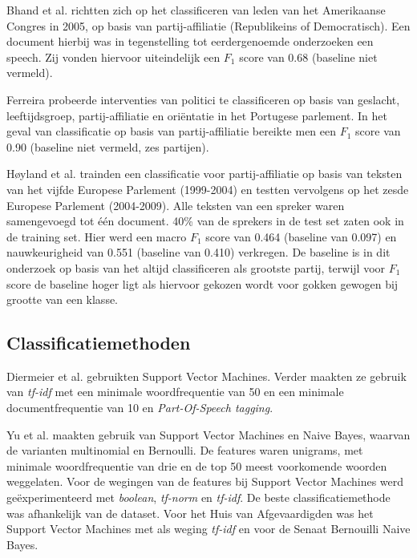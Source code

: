 Bhand et al. \cite{bhand} richtten zich op het classificeren van leden van het Amerikaanse Congres in 2005, op basis van partij-affiliatie (Republikeins of Democratisch). Een document hierbij was in tegenstelling tot eerdergenoemde onderzoeken een speech. Zij vonden hiervoor uiteindelijk een $F_1$ score van 0.68 (baseline niet vermeld).\par

Ferreira \cite{Ferreira2016UsingTT} probeerde interventies van politici te classificeren op basis van geslacht, leeftijdsgroep, partij-affiliatie en oriëntatie in het Portugese parlement. In het geval van classificatie op basis van partij-affiliatie bereikte men een $F_1$ score van 0.90 (baseline niet vermeld, zes partijen).\par

Høyland et al. \cite{W14-2516} trainden een classificatie voor partij-affiliatie op basis van teksten van het vijfde Europese Parlement (1999-2004) en testten vervolgens op het zesde Europese Parlement (2004-2009). Alle teksten van een spreker waren samengevoegd tot één document. 40\% van de sprekers in de test set zaten ook in de training set. Hier werd een macro $F_1$ score van 0.464 (baseline van 0.097) en nauwkeurigheid van 0.551 (baseline van 0.410) verkregen. De baseline is in dit onderzoek op basis van het altijd classificeren als grootste partij, terwijl voor $F_1$ score de baseline hoger ligt als hiervoor gekozen wordt voor gokken gewogen bij grootte van een klasse. \par

\subsection{Classificatiemethoden}
\label{sec:Deelvraag1}
Diermeier et al. \cite{diermeier_godbout_yu_kaufmann_2012} gebruikten Support Vector Machines. Verder maakten ze gebruik van \textit{tf-idf} met een minimale woordfrequentie van 50 en een minimale documentfrequentie van 10 en \textit{Part-Of-Speech tagging}.\par

Yu et al. \cite{doi:10.1080/19331680802149608} maakten gebruik van Support Vector Machines en Naive Bayes, waarvan de varianten multinomial en Bernoulli. De features waren unigrams, met minimale woordfrequentie van drie en de top 50 meest voorkomende woorden weggelaten. Voor de wegingen van de features bij Support Vector Machines werd geëxperimenteerd met \textit{boolean}, \textit{tf-norm} en \textit{tf-idf}. De beste classificatiemethode was afhankelijk van de dataset. Voor het Huis van Afgevaardigden was het Support Vector Machines met als weging \textit{tf-idf} en voor de Senaat Bernouilli Naive Bayes.

